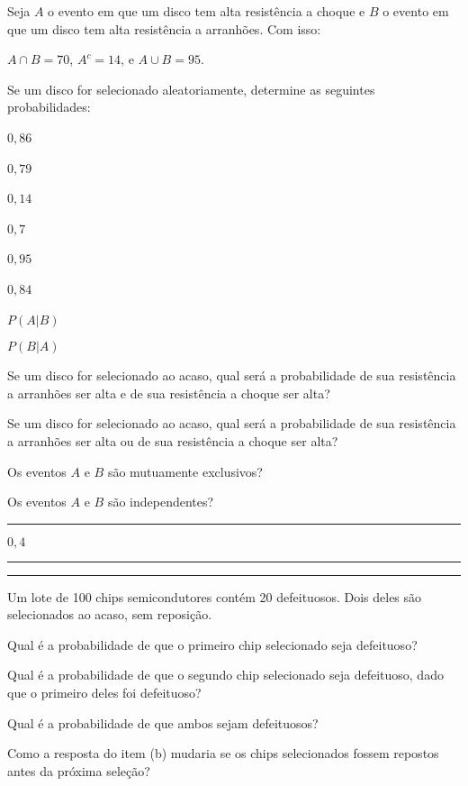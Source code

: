 \documentclass[a4paper,11pt,fleqn]{article}\usepackage[]{graphicx}\usepackage[]{color}
\theoremstyle{definition}
\begin{document}
\begin{compactenum}
  Seja $A$ o evento em que um disco tem alta resistência a choque e $B$
  o evento em que um disco tem alta resistência a arranhões. Com isso:
  \begin{compactenum}
  \item $A \cap B = 70$, $A^{c} = 14$, e $A \cup B = 95$.
  \item Se um disco for selecionado aleatoriamente, determine as
    seguintes probabilidades: \\
    \begin{inparaenum}
    \item $0,86$ \,
    \item $0,79$ \,
    \item $0,14$ \,
    \item $0,7$ \,
    \item $0,95$ \,
    \item $0,84$ \,
    \item $P(A|B)$ \,
    \item $P(B|A)$
    \end{inparaenum}
  \item Se um disco for selecionado ao acaso, qual será a probabilidade
    de sua resistência a arranhões ser alta e de sua resistência a
    choque ser alta?
  \item Se um disco for selecionado ao acaso, qual será a probabilidade
    de sua resistência a arranhões ser alta ou de sua resistência a
    choque ser alta?
  \item Os eventos $A$ e $B$ são mutuamente exclusivos?
  \item Os eventos $A$ e $B$ são independentes?
  \end{compactenum}

\vspace{0.3cm}
\hrule
\vspace{0.3cm}

\item $0,4$

\vspace{0.3cm}
\hrule
\vspace{0.3cm}

\clearpage

\vspace{0.3cm}
\hrule
\vspace{0.3cm}

\item Um lote de 100 chips semicondutores contém 20 defeituosos. Dois
  deles são selecionados ao acaso, sem reposição.
  \begin{compactenum}
  \item Qual é a probabilidade de que o primeiro chip selecionado seja
    defeituoso?
  \item Qual é a probabilidade de que o segundo chip selecionado seja
    defeituoso, dado que o primeiro deles foi defeituoso?
  \item Qual é a probabilidade de que ambos sejam defeituosos?
  \item Como a resposta do item (b) mudaria se os chips selecionados
    fossem repostos antes da próxima seleção?
  \end{compactenum}


\end{compactenum}
\end{document}
